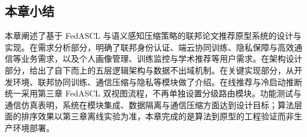\subsection{本章小结}
\label{sec:sys_summary}

本章阐述了基于 FedASCL 与语义感知压缩策略的联邦论文推荐原型系统的设计与实现。在需求分析部分，明确了联邦身份认证、端云协同训练、隐私保障与高效通信等业务需求，以及个人画像管理、训练监控与学术推荐等用户需求。在架构设计部分，给出了自下而上的五层逻辑架构与数据不出域机制。在关键实现部分，从开发环境、联邦协同训练、通信压缩与隐私等模块做了介绍。在线推荐与冷启动推断统一采用第三章 FedASCL 双视图流程，不再单独设置分级路由模块。功能测试与通信仿真表明，系统在模块集成、数据隔离与通信压缩方面达到设计目标；算法层面的排序效果以第三章离线实验为准，本章完成的是算法到原型的工程验证而非生产环境部署。
